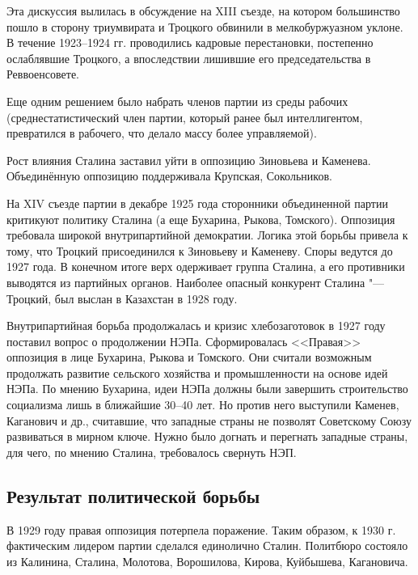 Эта дискуссия вылилась в обсуждение на XIII съезде, на котором большинство пошло в сторону триумвирата и Троцкого обвинили в мелкобуржуазном уклоне. В течение 1923--1924 гг. проводились кадровые перестановки, постепенно ослаблявшие Троцкого, а впоследствии лишившие его председательства в Реввоенсовете. 

Еще одним решением было набрать членов партии из среды рабочих (среднестатистический член партии, который ранее был интеллигентом, превратился в рабочего, что делало массу более управляемой).

Рост влияния Сталина заставил уйти в оппозицию Зиновьева и Каменева. Объединённую оппозицию поддерживала Крупская, Сокольников.

На XIV съезде партии в декабре 1925 года сторонники объединенной партии критикуют политику Сталина (а еще Бухарина, Рыкова, Томского). Оппозиция требовала широкой внутрипартийной демократии. Логика этой борьбы привела к тому, что Троцкий присоединился к Зиновьеву и Каменеву. Споры ведутся до 1927 года. В конечном итоге верх одерживает группа Сталина, а его противники выводятся из партийных органов. Наиболее опасный конкурент Сталина "--- Троцкий, был выслан в Казахстан в 1928 году.

Внутрипартийная борьба продолжалась и кризис хлебозаготовок в 1927 году поставил вопрос о продолжении НЭПа. Сформировалась <<Правая>> оппозиция в лице Бухарина, Рыкова и Томского. Они считали возможным продолжать развитие сельского хозяйства и промышленности на основе идей НЭПа. По мнению Бухарина, идеи НЭПа должны были завершить строительство социализма лишь в ближайшие 30--40 лет. Но против него выступили Каменев, Каганович и др., считавшие, что западные страны не позволят Советскому Союзу развиваться в мирном ключе. Нужно было догнать и перегнать западные страны, для чего, по мнению Сталина, требовалось свернуть НЭП. 

\subsection{Результат политической борьбы}

В 1929 году правая оппозиция потерпела поражение. Таким образом, к 1930 г. фактическим лидером партии сделался единолично Сталин. Политбюро состояло из Калинина, Сталина, Молотова, Ворошилова, Кирова, Куйбышева, Кагановича.


